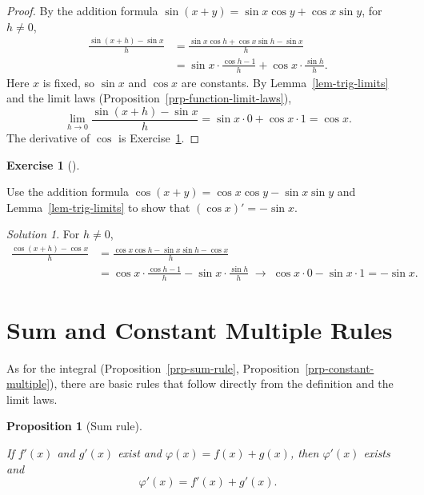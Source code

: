 \documentclass[
  letterpaper,
  DIV=11,
  numbers=noendperiod]{scrreprt}
\theoremstyle{plain}
\theoremstyle{plain}
\newtheorem{proposition}{Proposition}[chapter]
\theoremstyle{definition}
\theoremstyle{definition}
\newtheorem{exercise}{Exercise}[chapter]
\theoremstyle{definition}
\theoremstyle{plain}
\theoremstyle{plain}
\theoremstyle{remark}
\newtheorem*{solution}{Solution}
\begin{document}
\begin{proof}
By the addition formula \(\sin(x+y) = \sin x\cos y + \cos x\sin y\), for
\(h\neq0\), \[
\begin{aligned}
\frac{\sin(x+h)-\sin x}{h}
&= \frac{\sin x\cos h + \cos x\sin h - \sin x}{h} \\
&= \sin x\cdot\frac{\cos h-1}{h} + \cos x\cdot\frac{\sin h}{h}.
\end{aligned}
\] Here \(x\) is fixed, so \(\sin x\) and \(\cos x\) are constants. By
Lemma~\ref{lem-trig-limits} and the limit laws
(Proposition~\ref{prp-function-limit-laws}), \[
\lim_{h\to0}\frac{\sin(x+h)-\sin x}{h} = \sin x\cdot 0 + \cos x\cdot 1 = \cos x .
\] The derivative of \(\cos\) is Exercise~\ref{exr-derivative-cos}.
\end{proof}

\begin{exercise}[]\protect\hypertarget{exr-derivative-cos}{}\label{exr-derivative-cos}

Use the addition formula \(\cos(x+y) = \cos x\cos y - \sin x\sin y\) and
Lemma~\ref{lem-trig-limits} to show that \((\cos x)' = -\sin x\).

\end{exercise}

\begin{solution}
For \(h\neq0\),
\begin{align}
\frac{\cos(x+h)-\cos x}{h} & = \frac{\cos x\cos h - \sin x\sin h-\cos x}{h} \\
& = \cos x\cdot\frac{\cos h-1}{h} - \sin x\cdot\frac{\sin h}{h}
\;\longrightarrow\; \cos x\cdot 0 - \sin x\cdot 1 = -\sin x .
\end{align}

\end{solution}

\section{Sum and Constant Multiple
Rules}\label{sum-and-constant-multiple-rules}

As for the integral (Proposition~\ref{prp-sum-rule},
Proposition~\ref{prp-constant-multiple}), there are basic rules that
follow directly from the definition and the limit laws.

\begin{proposition}[Sum
rule]\protect\hypertarget{prp-derivative-sum-rule}{}\label{prp-derivative-sum-rule}

If \(f'(x)\) and \(g'(x)\) exist and \(\varphi(x) = f(x)+g(x)\), then
\(\varphi'(x)\) exists and \[
\varphi'(x) = f'(x)+g'(x).
\]

\end{proposition}
\end{document}
